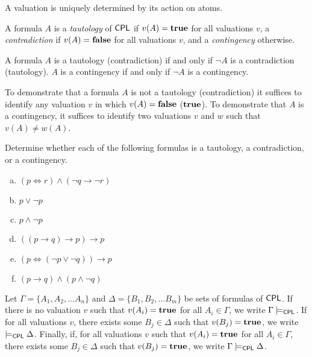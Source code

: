 \documentclass{article}
\begin{document}
\begin{proposition}
A valuation is uniquely determined by its action on atoms.
\end{proposition}

\begin{definition}
    A formula $A$ is a \emph{tautology} of $\mathsf{CPL}$ if $v(A) = \mathbf{true}$ for all valuations $v$, a \emph{contradiction} if $v(A) = \mathbf{false}$ for all valuations $v$, and a \emph{contingency} otherwise.
\end{definition}

\begin{proposition}
A formula $A$ is a tautology (contradiction) if and only if $\neg A$ is a contradiction (tautology). $A$ is a contingency if and only if $\neg A$ is a contingency.
\end{proposition}

\begin{proposition}
To demonstrate that a formula $A$ is not a tautology (contradiction) it suffices to identify any valuation $v$ in which $v(A) = \mathbf{false}$ ($\mathbf{true}$). To demonstrate that $A$ is a contingency, it suffices to identify two valuations $v$ and $w$ such that $v(A) \neq w(A)$.
\end{proposition}

\begin{prob}{2.1}
    Determine whether each of the following formulas is a tautology, a contradiction, or a contingency.
    \begin{multicols}{2}
    \begin{enumerate}[a)]
    \item $(p \iff r) \wedge (\neg q \to \neg r)$
    \item $p \vee \neg p$
    \item $p \wedge \neg p$
    \item $((p \to q) \to p) \to p$
    \item $(p \iff (\neg p \vee \neg q)) \to p$
    \item $(p \to q) \wedge (p \wedge \neg q)$
    \end{enumerate}
    \end{multicols}
\end{prob}

\begin{definition}
    Let $\Gamma = \{A_1, A_2, \dots A_n \}$ and $\Delta = \{B_1, B_2, \dots B_m \}$ be sets of formulas of $\mathsf{CPL}$. If there is no valuation $v$ such that $v(A_i) = \mathbf{true}$ for all $A_i \in \Gamma$, we write $\Gamma \models_{\mathsf{CPL}}$. If for all valuations $v$, there exists some $B_j \in \Delta$ such that $v(B_j) = \mathbf{true}$, we write $\models_{\mathsf{CPL}} \Delta$. Finally, if, for all valuations $v$ such that $v(A_i) = \mathbf{true}$ for all $A_i \in \Gamma$, there exists some $B_j \in \Delta$ such that $v(B_j) = \mathbf{true}$, we write $\Gamma \models_{\mathsf{CPL}} \Delta$. 
\end{definition}
\end{document}
